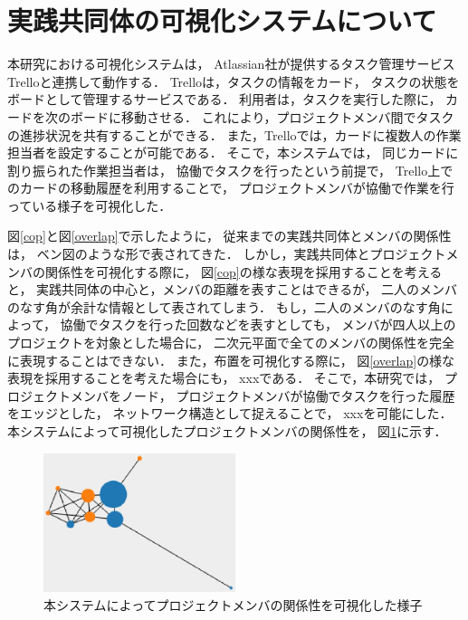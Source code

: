 \documentclass[submit,techrep]{ipsj}
\begin{document}

\section{実践共同体の可視化システムについて}
\label{system-map}

本研究における可視化システムは，
Atlassian社が提供するタスク管理サービスTrello\cite{trello}と連携して動作する．
Trelloは，タスクの情報をカード，
タスクの状態をボードとして管理するサービスである．
利用者は，タスクを実行した際に，
カードを次のボードに移動させる．
これにより，プロジェクトメンバ間でタスクの進捗状況を共有することができる．
また，Trelloでは，カードに複数人の作業担当者を設定することが可能である．
そこで，本システムでは，
同じカードに割り振られた作業担当者は，
協働でタスクを行ったという前提で，
Trello上でのカードの移動履歴を利用することで，
プロジェクトメンバが協働で作業を行っている様子を可視化した．

図\ref{cop}と図\ref{overlap}で示したように，
従来までの実践共同体とメンバの関係性は，
ベン図のような形で表されてきた．
しかし，実践共同体とプロジェクトメンバの関係性を可視化する際に，
図\ref{cop}の様な表現を採用することを考えると，
実践共同体の中心と，メンバの距離を表すことはできるが，
二人のメンバのなす角が余計な情報として表されてしまう．
もし，二人のメンバのなす角によって，
協働でタスクを行った回数などを表すとしても，
メンバが四人以上のプロジェクトを対象とした場合に，
二次元平面で全てのメンバの関係性を完全に表現することはできない．
また，布置を可視化する際に，
図\ref{overlap}の様な表現を採用することを考えた場合にも，
xxxである．
そこで，本研究では，
プロジェクトメンバをノード，
プロジェクトメンバが協働でタスクを行った履歴をエッジとした，
ネットワーク構造として捉えることで，
xxxを可能にした．
本システムによって可視化したプロジェクトメンバの関係性を，
図\ref{cop-map-graph}に示す．

\begin{figure}[h]
  \centering
  \includegraphics[width=0.5\textwidth]{img/cop-map-graph.eps}
  \caption{本システムによってプロジェクトメンバの関係性を可視化した様子}
  \label{cop-map-graph}
\end{figure}
\end{document}
